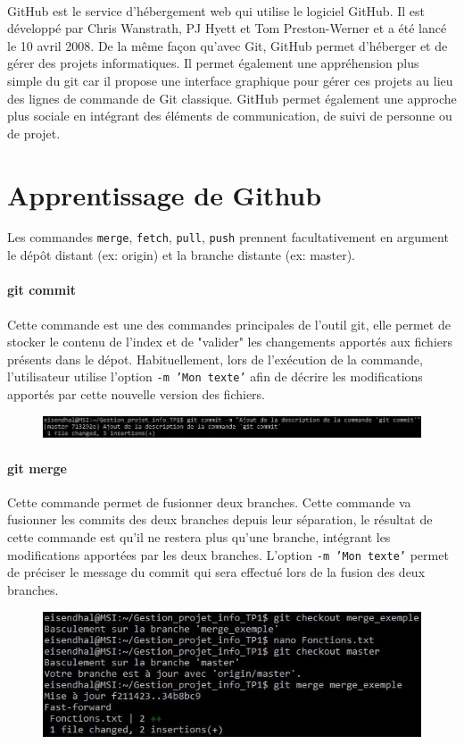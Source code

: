 \documentclass[11pt,canadien]{article}
\begin{document}
\paragraph{} GitHub est le service d'hébergement web qui utilise le logiciel GitHub. Il est développé par Chris Wanstrath, PJ Hyett et Tom Preston-Werner et a été lancé le 10 avril 2008. De la même façon qu'avec Git, GitHub permet d'héberger et de gérer des projets informatiques. Il permet également une appréhension plus simple du git car il propose une interface graphique pour gérer ces projets au lieu des lignes de commande de Git classique. GitHub permet également une approche plus sociale en intégrant des éléments de communication, de suivi de personne ou de projet.

\section{Apprentissage de Github}
Les commandes \texttt{merge}, \texttt{fetch}, \texttt{pull}, \texttt{push} prennent facultativement en argument le dépôt distant (ex: origin) et la branche distante (ex: master).

\paragraph{git commit}Cette commande est une des commandes principales de l'outil git, elle permet de stocker le contenu de l'index et de "valider" les changements apportés aux fichiers présents dans le dépot. Habituellement, lors de l'exécution de la commande, l'utilisateur utilise l'option \texttt{-m 'Mon texte'} afin de décrire les modifications apportés par cette nouvelle version des fichiers.
\begin{figure}[H]
	\centering
	\includegraphics[width=\textwidth]{images/git_commit.jpg}
\end{figure}

\paragraph{git merge}Cette commande permet de fusionner deux branches. Cette commande va fusionner les commits des deux branches depuis leur séparation, le résultat de cette commande est qu'il ne restera plus qu'une branche, intégrant les modifications apportées par les deux branches. L'option \texttt{-m 'Mon texte'} permet de préciser le message du commit qui sera effectué lors de la fusion des deux branches.
\begin{figure}[H]
	\centering
	\includegraphics[width=\textwidth]{images/git_merge.jpg}
\end{figure}
\end{document}
